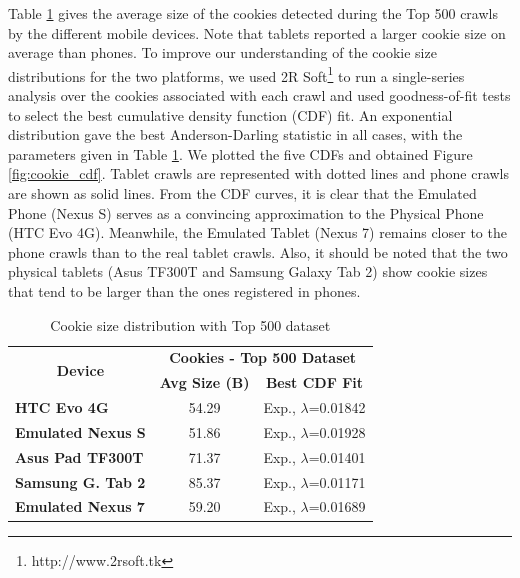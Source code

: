 \documentclass{acm_proc_article-sp}
\begin{document}
Table \ref{tab:cookie_sizes} gives the average size of the cookies detected during the Top 500 crawls by the different mobile devices. Note that tablets reported a larger cookie size on average than phones. To improve our understanding of the cookie size distributions for the two platforms, we used 2R Soft\footnote{http://www.2rsoft.tk} to run a single-series analysis over the cookies associated with each crawl and used goodness-of-fit tests to select the best cumulative density function (CDF) fit. An exponential distribution gave the best Anderson-Darling statistic in all cases, with the parameters given in Table \ref{tab:cookie_sizes}. We plotted the five CDFs and obtained Figure \ref{fig:cookie_cdf}. Tablet crawls are represented with dotted lines and phone crawls are shown as solid lines. From the CDF curves, it is clear that the Emulated Phone (Nexus S) serves as a convincing approximation to the Physical Phone (HTC Evo 4G). Meanwhile, the Emulated Tablet (Nexus 7) remains closer to the phone crawls than to the real tablet crawls. Also, it should be noted that the two physical tablets (Asus TF300T and Samsung Galaxy Tab 2) show cookie sizes that tend to be larger than the ones registered in phones.

\begin{table}[htbp]
  \centering
  \caption{Cookie size distribution with Top 500 dataset}
    \begin{tabular}{|c|c|c|}
    \hline
    \multicolumn{1}{|c|}{\multirow{2}[4]{*}{\textbf{Device}}} & \multicolumn{2}{|c|}{\textbf{Cookies - Top 500 Dataset}} \\ \cline{2-3}
    \multicolumn{1}{|c|}{} & \textbf{Avg Size (B)} & \textbf{Best CDF Fit} \\ \hline
    \multicolumn{1}{|l|}{\textbf{HTC Evo 4G}} & 54.29 & Exp., $\lambda$=0.01842 \\
    \multicolumn{1}{|l|}{\textbf{Emulated Nexus S}} & 51.86 & Exp., $\lambda$=0.01928 \\
    \multicolumn{1}{|l|}{\textbf{Asus Pad TF300T}} & 71.37 & Exp., $\lambda$=0.01401 \\
    \multicolumn{1}{|l|}{\textbf{Samsung G. Tab 2}} & 85.37 & Exp., $\lambda$=0.01171 \\
    \multicolumn{1}{|l|}{\textbf{Emulated Nexus 7}} & 59.20 & Exp., $\lambda$=0.01689 \\ \hline
    \end{tabular}%
  \label{tab:cookie_sizes}%
\end{table}%
\end{document}
